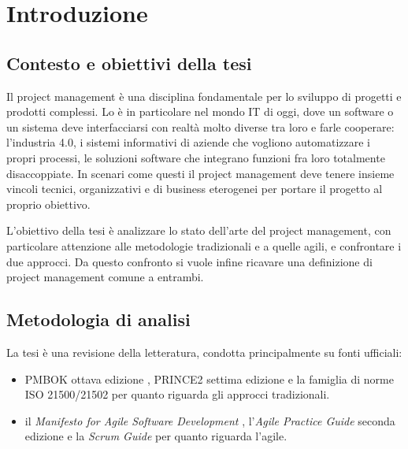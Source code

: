\chapter*{Introduzione}

\section*{Contesto e obiettivi della tesi}

Il project management \`e una disciplina fondamentale per lo sviluppo di
progetti e prodotti complessi. Lo \`e in particolare nel mondo IT di oggi, dove
un software o un sistema deve interfacciarsi con realt\`a molto diverse tra
loro e farle cooperare: l'industria 4.0, i sistemi informativi di aziende che
vogliono automatizzare i propri processi, le soluzioni software che integrano funzioni fra
loro totalmente disaccoppiate. In scenari come questi il project management
deve tenere insieme vincoli tecnici, organizzativi e di business eterogenei
per portare il progetto al proprio obiettivo.

L'obiettivo della tesi \`e analizzare lo stato dell'arte del project
management, con particolare attenzione alle metodologie tradizionali e a
quelle agili, e confrontare i due approcci. Da questo confronto si vuole
infine ricavare una definizione di project management comune a entrambi.

\section*{Metodologia di analisi}

La tesi \`e una revisione della letteratura, condotta principalmente su fonti
ufficiali:
\begin{itemize}
    \item PMBOK ottava edizione \cite{pmbok8}, PRINCE2
settima edizione \cite{prince27} e la famiglia di norme ISO 21500/21502
\cite{iso21500-2021,iso21502} per quanto riguarda gli approcci tradizionali.

    \item  il \emph{Manifesto for Agile Software Development} \cite{agilemanifesto},
l'\emph{Agile Practice Guide} seconda edizione \cite{agilepracticeguide2} e la
\emph{Scrum Guide} \cite{scrumguide2020} per quanto riguarda l'agile.
\end{itemize}

